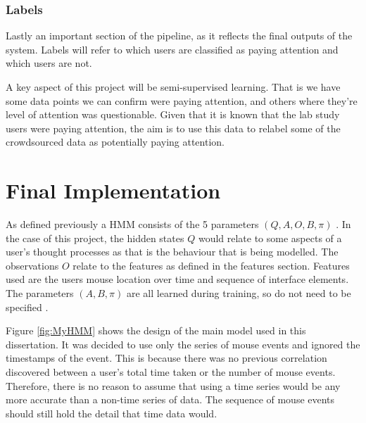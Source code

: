 \documentclass{article}
\begin{document}
\subsubsection{Labels}


Lastly an important section of the pipeline, as it reflects the final outputs of the system.
Labels will refer to which users are classified as paying attention and which users are not.

A key aspect of this project will be semi-supervised learning.
That is we have some data points we can confirm were paying attention, and others where they're level of attention was questionable.
Given that it is known that the lab study users were paying attention, the aim is to use this data to relabel some of the crowdsourced data as potentially paying attention.



\section{Final Implementation}


As defined previously a HMM consists of the 5 parameters $(Q,A,O,B,\pi)$ \cite{jurafsky2018speech}.
In the case of this project, the hidden states $Q$ would relate to some aspects of a user's thought processes as that is the behaviour that is being modelled.
The observations $O$ relate to the features as defined in the features section.
Features used are the users mouse location over time and sequence of interface elements.
The parameters $(A,B,\pi)$ are all learned during training, so do not need to be specified \cite{porwal2013machine}.

Figure \ref{fig:MyHMM} shows the design of the main model used in this dissertation.
It was decided to use only the series of mouse events and ignored the timestamps of the event. %
This is because there was no previous correlation discovered between a user’s total time taken or the number of mouse events. 
Therefore, there is no reason to assume that using a time series would be any more accurate than a non-time series of data. 
The sequence of mouse events should still hold the detail that time data would.
\end{document}
